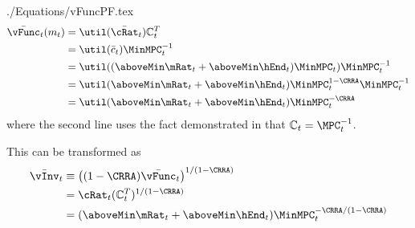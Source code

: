 \documentclass[titlepage]{\econtex}
\begin{document}
\begin{verbatimwrite}{./Equations/vFuncPF.tex}
  \begin{equation}\begin{gathered}\begin{aligned}
    \bar{\vFunc}_{t}({m}_{t})  & = \util(\bar{\cRat}_{t})\mathbb{C}_{t}^{T}\label{eq:vFuncPF}
    \\  & = \util(\bar{c}_{t}) \MinMPC_{t}^{-1} %
    \\  & = \util((\aboveMin \mRat_{t}+\aboveMin \hEnd_{t})\MinMPC_{t}) \MinMPC_{t}^{-1} %
    \\  & = \util(\aboveMin \mRat_{t}+\aboveMin \hEnd_{t})\MinMPC_{t}^{1-\CRRA} \MinMPC_{t}^{-1} %
    \\  & = \util(\aboveMin \mRat_{t}+\aboveMin \hEnd_{t})\MinMPC_{t}^{-\CRRA}  %
  \end{aligned}\end{gathered}\end{equation}
  where the second line uses the fact demonstrated in \cite{BufferStockTheory} that $\mathbb{C}_{t}=\MPC^{-1}_{t}$. %

  This can be transformed as
  \begin{equation*}\begin{gathered}\begin{aligned}
    \bar{\vInv}_{t}  & \equiv  \left((1-\CRRA)\bar{\vFunc}_{t}\right)^{1/(1-\CRRA)}
    \\  & = \cRat_{t}(\mathbb{C}_{t}^{T})^{1/(1-\CRRA)}
    \\  & = (\aboveMin \mRat_{t}+\aboveMin \hEnd_{t})\MinMPC_{t}^{-\CRRA/(1-\CRRA)}   %
  \end{aligned}\end{gathered}\end{equation*}
\end{verbatimwrite}

\end{document}
